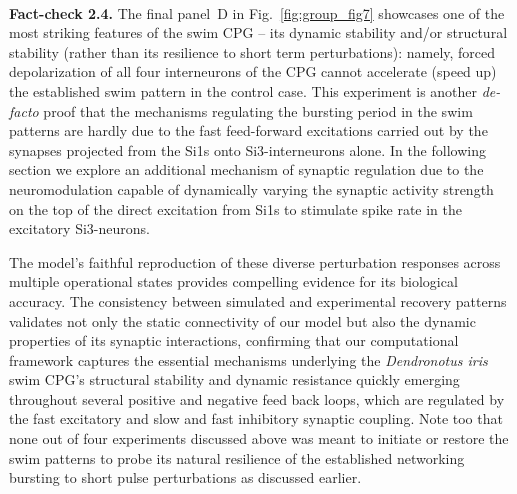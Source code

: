 \documentclass[nofootinbib,aip,amsmath,amssymb,reprint,twocolumn,10pt]{revtex4-2}
\begin{document}
~\\
{\bf Fact-check 2.4.} The final panel~D in Fig.~\ref{fig:group_fig7} showcases one of the most striking features of the swim CPG -- its dynamic stability and/or structural stability (rather than its resilience to short term perturbations): namely, forced depolarization of all four interneurons of the CPG cannot accelerate (speed up) the established swim pattern in the control case. This experiment is another {\em de-facto} proof that the mechanisms regulating the bursting period in the swim patterns are hardly due to the fast feed-forward excitations carried out by the synapses projected from the Si1s onto Si3-interneurons alone. In the following section we explore an additional  mechanism of synaptic regulation due to the neuromodulation capable of dynamically varying the synaptic activity strength on the top of the direct excitation from Si1s to stimulate spike rate in the excitatory Si3-neurons.      

The model's faithful reproduction of these diverse perturbation responses across multiple operational states provides compelling evidence for its biological accuracy. The consistency between simulated and experimental recovery patterns validates not only the static connectivity of our model but also the dynamic properties of its synaptic interactions, confirming that our computational framework captures the essential mechanisms underlying the \textit{Dendronotus iris} swim CPG's structural stability and dynamic resistance quickly emerging throughout several positive and negative feed back loops, which are regulated by the fast excitatory and slow and fast inhibitory synaptic coupling. Note too that none out of four experiments discussed above was meant to initiate or restore the swim patterns to probe its natural resilience of the established networking bursting to short pulse perturbations as discussed earlier. 
\end{document}

